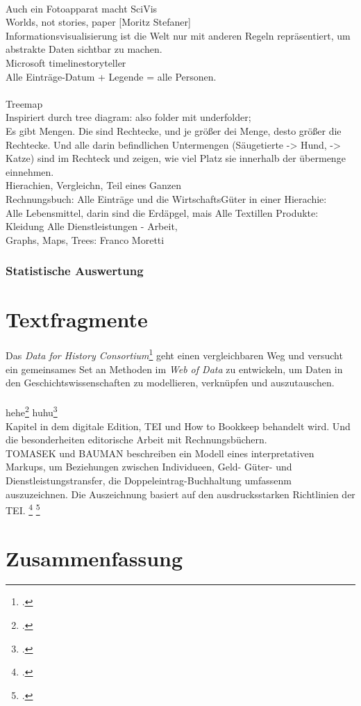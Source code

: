 \documentclass[12pt,a4paper]{article}
\begin{document}
\\
Auch ein Fotoapparat macht SciVis
\\
Worlds, not stories, paper [Moritz Stefaner]
\\
Informationsvisualisierung ist die Welt nur mit anderen Regeln repräsentiert, um abstrakte Daten sichtbar zu machen.
\\
Microsoft timelinestoryteller
\\
Alle Einträge-Datum + Legende = alle Personen.
\\
\\
Treemap
\\
Inspiriert durch tree diagram: also folder mit underfolder;
\\
Es gibt Mengen. Die sind Rechtecke, und je größer dei Menge, desto größer die Rechtecke. Und alle darin befindlichen Untermengen (Säugetierte -> Hund, -> Katze) sind im Rechteck und zeigen, wie viel Platz sie innerhalb der übermenge einnehmen.
\\
Hierachien, Vergleichn, Teil eines Ganzen
\\
Rechnungsbuch: Alle Einträge und die WirtschaftsGüter in einer Hierachie: 
\\
Alle Lebensmittel, darin sind die Erdäpgel, mais
Alle Textillen Produkte: Kleidung
Alle Dienstleistungen - Arbeit, 
\\
Graphs, Maps, Trees: Franco Moretti 





\subsubsection{Statistische Auswertung}

\section{Textfragmente}

Das \textit{Data for History Consortium}\footcite{beretta2017dataforhistory} geht einen vergleichbaren Weg und versucht ein gemeinsames Set an Methoden im \textit{Web of Data} zu entwickeln, um Daten in den Geschichtswissenschaften zu modellieren, verknüpfen und auszutauschen.
\\
\\
hehe\footcite[Vgl.][]{sahle2013digitale}
huhu\footcite[Vgl][S.234-252]{jannidis2017digital} 
\\
Kapitel in dem digitale Edition, TEI und How to Bookkeep behandelt wird. Und die besonderheiten editorische Arbeit mit Rechnungsbüchern. 
\\
TOMASEK und BAUMAN beschreiben ein Modell eines interpretativen Markups, um Beziehungen zwischen Individueen, Geld- Güter- und Dienstleistungstransfer, die Doppeleintrag-Buchhaltung umfassenm auszuzeichnen. Die Auszeichnung basiert auf den ausdrucksstarken Richtlinien der TEI. \footcite[Vgl.][S.1-2, \protect\url{http://journals.openedition.org/jtei/895}, 08.03.2018]{tomasek2013encoding}
\footcite[][S.41-44]{kobler2010qualitat}


\section{Zusammenfassung}

\newpage


\newpage
\listoffigures
\end{document}
